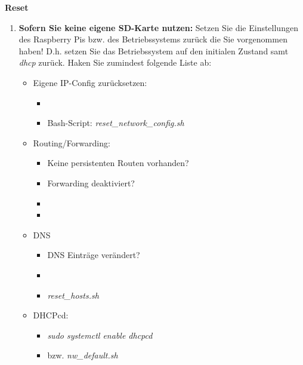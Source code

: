 \documentclass[paper=a4,fontsize=11pt]{scrartcl}%
\numberwithin{equation}{section}
\begin{document}
\begin{center}\Large{\textbf{Reset}}\end{center}\vskip0.25in
\begin{enumerate}
\item \textbf{Sofern Sie keine eigene SD-Karte nutzen:} Setzen Sie die Einstellungen des Raspberry Pis bzw. des Betriebssystems zurück die Sie vorgenommen haben! D.h. setzen Sie das Betriebssystem auf den initialen Zustand samt \emph{dhcp} zurück. Haken Sie zumindest folgende Liste ab:
\begin{itemize}
	\item Eigene IP-Config zurücksetzen:
	\begin{itemize}
		\item {}
		\item Bash-Script: \emph{reset\_network\_config.sh}
	\end{itemize}
	\item Routing/Forwarding:
	\begin{itemize}
		\item Keine persistenten Routen vorhanden?
		\item Forwarding deaktiviert? 
		\item {}
		\item {}
	\end{itemize}
	\item DNS
	\begin{itemize}
		\item DNS Einträge verändert?
		\item {}
		\item \emph{reset\_hosts.sh}
	\end{itemize}
	\item DHCPcd:
	\begin{itemize}
		\item \emph{sudo systemctl enable dhcpcd}
		\item bzw. \emph{nw\_default.sh}
	\end{itemize}
\end{itemize}
\end{enumerate}
\end{document}
